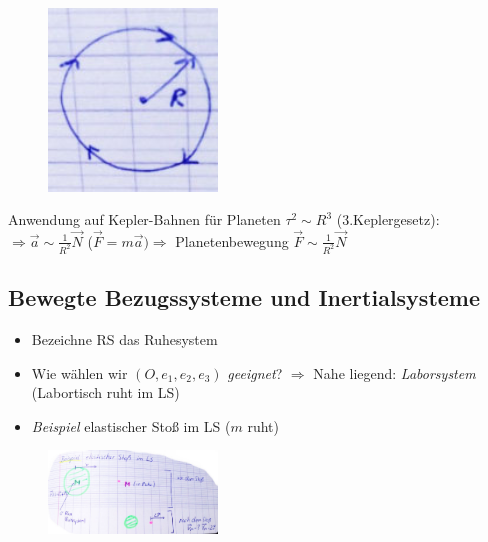 \begin{description}
\begin{enumerate}
\begin{figure}[h]
\begin{center}
\includegraphics[width=0.4\textwidth]{Skizzen/Anhang7.jpg}
\end{center}
\caption{}
\end{figure}
Anwendung auf Kepler-Bahnen für Planeten $\tau^2\sim R^3$ (3.Keplergesetz):\\
$\Rightarrow\vec{a}\sim \frac{1}{R^2}\vec{N}$ ($\vec{F}=m\vec{a}) \Rightarrow$ Planetenbewegung $\vec{F}\sim \frac{1}{R^2}\vec{N}$

\end{enumerate}
\end{description}

\subsection{Bewegte Bezugssysteme und Inertialsysteme}
\begin{itemize}
\item Bezeichne RS das Ruhesystem
\item Wie wählen wir $(O,e_1,e_2,e_3)$ \emph{geeignet}? $\Rightarrow$
  Nahe liegend: \emph{Laborsystem} (Labortisch ruht im LS)
\item \emph{Beispiel} elastischer Stoß im LS ($m$ ruht)
\end{itemize}
\begin{figure}[h]
\begin{center}
\includegraphics[width=0.4\textwidth]{Skizzen/Anhang6.jpg}
\end{center}
\caption{}
\end{figure}

